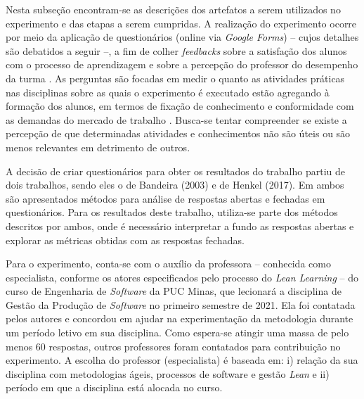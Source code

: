 Nesta subseção encontram-se as descrições dos artefatos a serem utilizados no experimento e das etapas a serem cumpridas. A realização do experimento ocorre por meio da aplicação de questionários (online via \textit{Google Forms}) -- cujos detalhes são debatidos a seguir --, a fim de colher \textit{feedbacks} sobre a satisfação dos alunos com o processo de aprendizagem e sobre a percepção do professor do desempenho da turma \cite{chatley2017lean}. As perguntas são focadas em medir o quanto as atividades práticas nas disciplinas sobre as quais o experimento é executado estão agregando à formação dos alunos, em termos de fixação de conhecimento e conformidade com as demandas do mercado de trabalho \cite{chatley2017lean}. Busca-se tentar compreender se existe a percepção de que determinadas atividades e conhecimentos não são úteis ou são menos relevantes em detrimento de outros.

A decisão de criar questionários para obter os resultados do trabalho partiu de dois trabalhos, sendo eles o de Bandeira (2003)\nocite{Questionarios1} e de Henkel (2017)\nocite{Questionarios2}. Em ambos são apresentados métodos para análise de respostas abertas e fechadas em questionários. Para os resultados deste trabalho, utiliza-se parte dos métodos descritos por ambos, onde é necessário interpretar a fundo as respostas abertas e explorar as métricas obtidas com as respostas fechadas.

Para o experimento, conta-se com o auxílio da professora -- conhecida como especialista, conforme os atores especificados pelo processo do \textit{Lean Learning} -- do curso de Engenharia de \textit{Software} da PUC Minas, que lecionará a disciplina de Gestão da Produção de \textit{Software} no primeiro semestre de 2021. Ela foi contatada pelos autores e concordou em ajudar na experimentação da metodologia durante um período letivo em sua disciplina. Como espera-se atingir uma massa de pelo menos 60 respostas, outros professores foram contatados para contribuição no experimento. A escolha do professor (especialista) é baseada em: i) relação da sua disciplina com metodologias ágeis, processos de software e gestão \textit{Lean} e ii) período em que a disciplina está alocada no curso. 

